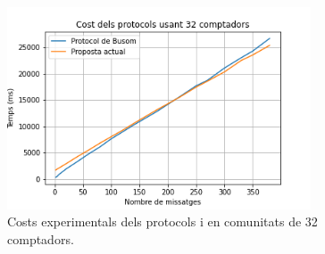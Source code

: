 \begin{figure}[H]
	\centering
	\includegraphics[width=9cm]{imgs/cost/32compt.png}
	\caption{Costs experimentals dels protocols \cite{recsi} i \cite{busom} en comunitats de 32 comptadors.}
	\label{fig:prottime32}
\end{figure}

